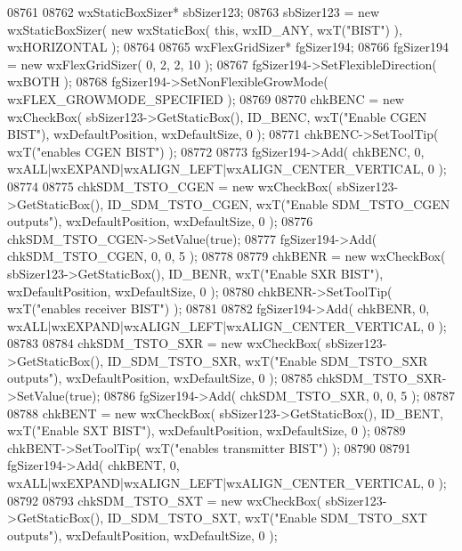 \begin{DoxyCode}
08761     
08762     wxStaticBoxSizer* sbSizer123;
08763     sbSizer123 = \textcolor{keyword}{new} wxStaticBoxSizer( \textcolor{keyword}{new} wxStaticBox( \textcolor{keyword}{this}, wxID\_ANY, wxT(\textcolor{stringliteral}{"BIST"}) ), wxHORIZONTAL );
08764     
08765     wxFlexGridSizer* fgSizer194;
08766     fgSizer194 = \textcolor{keyword}{new} wxFlexGridSizer( 0, 2, 2, 10 );
08767     fgSizer194->SetFlexibleDirection( wxBOTH );
08768     fgSizer194->SetNonFlexibleGrowMode( wxFLEX\_GROWMODE\_SPECIFIED );
08769     
08770     chkBENC = \textcolor{keyword}{new} wxCheckBox( sbSizer123->GetStaticBox(), ID_BENC, wxT(\textcolor{stringliteral}{"Enable CGEN BIST"}), 
      wxDefaultPosition, wxDefaultSize, 0 );
08771     chkBENC->SetToolTip( wxT(\textcolor{stringliteral}{"enables CGEN BIST"}) );
08772     
08773     fgSizer194->Add( chkBENC, 0, wxALL|wxEXPAND|wxALIGN\_LEFT|wxALIGN\_CENTER\_VERTICAL, 0 );
08774     
08775     chkSDM_TSTO_CGEN = \textcolor{keyword}{new} wxCheckBox( sbSizer123->GetStaticBox(), 
      ID_SDM_TSTO_CGEN, wxT(\textcolor{stringliteral}{"Enable SDM\_TSTO\_CGEN outputs"}), wxDefaultPosition, wxDefaultSize, 0 );
08776     chkSDM_TSTO_CGEN->SetValue(\textcolor{keyword}{true}); 
08777     fgSizer194->Add( chkSDM_TSTO_CGEN, 0, 0, 5 );
08778     
08779     chkBENR = \textcolor{keyword}{new} wxCheckBox( sbSizer123->GetStaticBox(), ID_BENR, wxT(\textcolor{stringliteral}{"Enable SXR BIST"}), 
      wxDefaultPosition, wxDefaultSize, 0 );
08780     chkBENR->SetToolTip( wxT(\textcolor{stringliteral}{"enables receiver BIST"}) );
08781     
08782     fgSizer194->Add( chkBENR, 0, wxALL|wxEXPAND|wxALIGN\_LEFT|wxALIGN\_CENTER\_VERTICAL, 0 );
08783     
08784     chkSDM_TSTO_SXR = \textcolor{keyword}{new} wxCheckBox( sbSizer123->GetStaticBox(), 
      ID_SDM_TSTO_SXR, wxT(\textcolor{stringliteral}{"Enable SDM\_TSTO\_SXR outputs"}), wxDefaultPosition, wxDefaultSize, 0 );
08785     chkSDM_TSTO_SXR->SetValue(\textcolor{keyword}{true}); 
08786     fgSizer194->Add( chkSDM_TSTO_SXR, 0, 0, 5 );
08787     
08788     chkBENT = \textcolor{keyword}{new} wxCheckBox( sbSizer123->GetStaticBox(), ID_BENT, wxT(\textcolor{stringliteral}{"Enable SXT BIST"}), 
      wxDefaultPosition, wxDefaultSize, 0 );
08789     chkBENT->SetToolTip( wxT(\textcolor{stringliteral}{"enables transmitter  BIST"}) );
08790     
08791     fgSizer194->Add( chkBENT, 0, wxALL|wxEXPAND|wxALIGN\_LEFT|wxALIGN\_CENTER\_VERTICAL, 0 );
08792     
08793     chkSDM_TSTO_SXT = \textcolor{keyword}{new} wxCheckBox( sbSizer123->GetStaticBox(), 
      ID_SDM_TSTO_SXT, wxT(\textcolor{stringliteral}{"Enable SDM\_TSTO\_SXT outputs"}), wxDefaultPosition, wxDefaultSize, 0 );

\end{DoxyCode}

